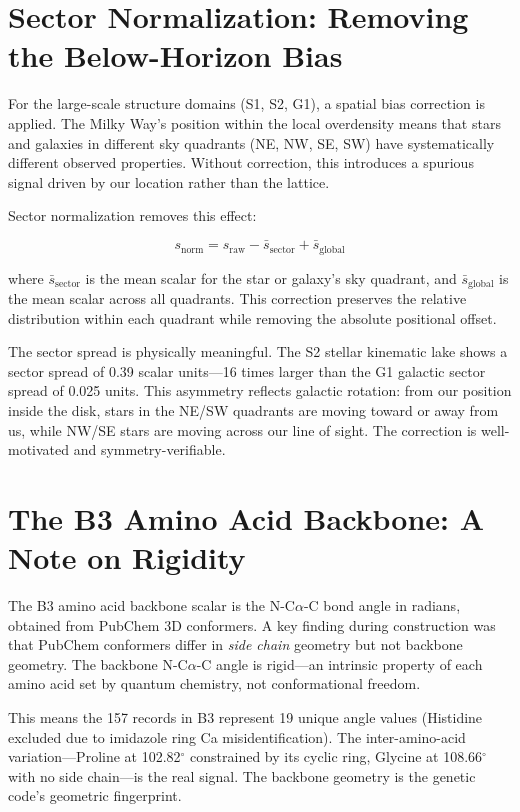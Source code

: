 \documentclass[11pt, letterpaper, openany]{book}
\begin{document}
\section*{Sector Normalization: Removing the Below-Horizon Bias}

For the large-scale structure domains (S1, S2, G1), a spatial bias correction is applied. The
Milky Way's position within the local overdensity means that stars and galaxies in different
sky quadrants (NE, NW, SE, SW) have systematically different observed properties. Without
correction, this introduces a spurious signal driven by our location rather than the lattice.

Sector normalization removes this effect:

\[
s_\text{norm} = s_\text{raw} - \bar{s}_\text{sector} + \bar{s}_\text{global}
\]

where $\bar{s}_\text{sector}$ is the mean scalar for the star or galaxy's sky quadrant, and
$\bar{s}_\text{global}$ is the mean scalar across all quadrants. This correction preserves the
relative distribution within each quadrant while removing the absolute positional offset.

The sector spread is physically meaningful. The S2 stellar kinematic lake shows a sector spread
of 0.39 scalar units---16 times larger than the G1 galactic sector spread of 0.025 units. This
asymmetry reflects galactic rotation: from our position inside the disk, stars in the
NE/SW quadrants are moving toward or away from us, while NW/SE stars are moving across our
line of sight. The correction is well-motivated and symmetry-verifiable.

\section*{The B3 Amino Acid Backbone: A Note on Rigidity}

The B3 amino acid backbone scalar is the N-C$\alpha$-C bond angle in radians, obtained from
PubChem 3D conformers. A key finding during construction was that PubChem conformers differ
in \emph{side chain} geometry but not backbone geometry. The backbone N-C$\alpha$-C angle is
rigid---an intrinsic property of each amino acid set by quantum chemistry, not conformational
freedom.

This means the 157 records in B3 represent 19 unique angle values (Histidine excluded due to
imidazole ring Ca misidentification). The inter-amino-acid variation---Proline at 102.82$^\circ$
constrained by its cyclic ring, Glycine at 108.66$^\circ$ with no side chain---is the real signal.
The backbone geometry is the genetic code's geometric fingerprint.
\end{document}

